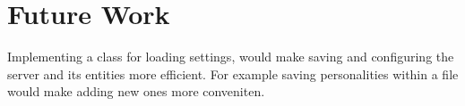 \section{Future Work}
Implementing a class for loading settings, would make saving and configuring the
server and its entities more efficient. For example saving personalities within
a file would make adding new ones more conveniten.
